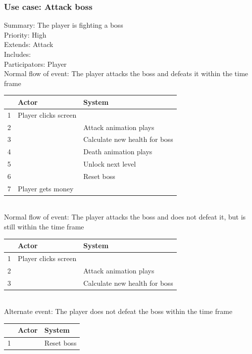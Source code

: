 \documentclass{article}
\begin{document}
\subsubsection{Use case: Attack boss}
Summary: The player is fighting a boss \\
Priority: High \\
Extends: Attack\\
Includes: \\
Participators: Player \\
Normal flow of event: The player attacks the boss and defeats it within the time frame \\
\begin{tabular}{|c|l|l|} \hline
    & Actor & System \\ \hline
    1 & Player clicks screen & \\ \hline
    2 & & Attack animation plays \\ \hline
    3 & & Calculate new health for boss \\ \hline
    4 & & Death animation plays \\ \hline
    5 & & Unlock next level \\ \hline
    6 & & Reset boss \\ \hline
    7 & Player gets money & \\ \hline
\end{tabular}\\
Normal flow of event: The player attacks the boss and does not defeat it, but is still within the time frame \\
\begin{tabular}{|c|l|l|} \hline
    & Actor & System \\ \hline
    1 & Player clicks screen & \\ \hline
    2 & & Attack animation plays \\ \hline
    3 & & Calculate new health for boss \\ \hline
\end{tabular}\\
Alternate event: The player does not defeat the boss within the time frame \\
\begin{tabular}{|c|l|l|} \hline
    & Actor & System \\ \hline
    1 & & Reset boss \\ \hline
\end{tabular}
\end{document}
